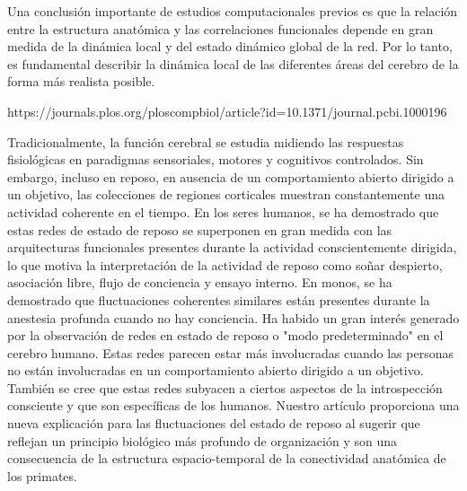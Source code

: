 Una conclusión importante de estudios computacionales previos es que la relación entre la estructura anatómica y las correlaciones funcionales depende en gran medida de la dinámica local y del estado dinámico global de la red. Por lo tanto, es fundamental describir la dinámica local de las diferentes áreas del cerebro de la forma más realista posible.

https://journals.plos.org/ploscompbiol/article?id=10.1371/journal.pcbi.1000196




Tradicionalmente, la función cerebral se estudia midiendo las respuestas fisiológicas en paradigmas sensoriales, motores y cognitivos controlados. Sin embargo, incluso en reposo, en ausencia de un comportamiento abierto dirigido a un objetivo, las colecciones de regiones corticales muestran constantemente una actividad coherente en el tiempo. En los seres humanos, se ha demostrado que estas redes de estado de reposo se superponen en gran medida con las arquitecturas funcionales presentes durante la actividad conscientemente dirigida, lo que motiva la interpretación de la actividad de reposo como soñar despierto, asociación libre, flujo de conciencia y ensayo interno. En monos, se ha demostrado que fluctuaciones coherentes similares están presentes durante la anestesia profunda cuando no hay conciencia.  Ha habido un gran interés generado por la observación de redes en estado de reposo o "modo predeterminado" en el cerebro humano. Estas redes parecen estar más involucradas cuando las personas no están involucradas en un comportamiento abierto dirigido a un objetivo. También se cree que estas redes subyacen a ciertos aspectos de la introspección consciente y que son específicas de los humanos. Nuestro artículo proporciona una nueva explicación para las fluctuaciones del estado de reposo al sugerir que reflejan un principio biológico más profundo de organización y son una consecuencia de la estructura espacio-temporal de la conectividad anatómica de los primates.



